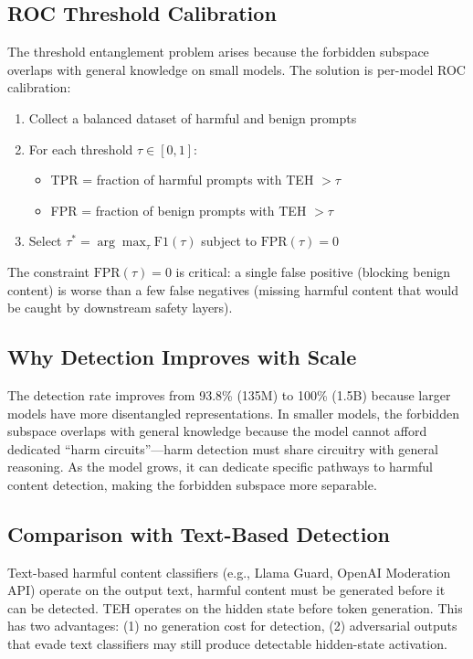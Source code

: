 \documentclass[11pt]{article}
\begin{document}
\subsection{ROC Threshold Calibration}

The threshold entanglement problem arises because the forbidden subspace overlaps with general knowledge on small models. The solution is per-model ROC calibration:

\begin{enumerate}[nosep]
\item Collect a balanced dataset of harmful and benign prompts
\item For each threshold $\tau \in [0, 1]$:
  \begin{itemize}[nosep]
  \item TPR = fraction of harmful prompts with TEH $> \tau$
  \item FPR = fraction of benign prompts with TEH $> \tau$
  \end{itemize}
\item Select $\tau^* = \arg\max_\tau \mathrm{F1}(\tau)$ subject to $\mathrm{FPR}(\tau) = 0$
\end{enumerate}

The constraint $\mathrm{FPR}(\tau) = 0$ is critical: a single false positive (blocking benign content) is worse than a few false negatives (missing harmful content that would be caught by downstream safety layers).

\subsection{Why Detection Improves with Scale}

The detection rate improves from 93.8\% (135M) to 100\% (1.5B) because larger models have more disentangled representations. In smaller models, the forbidden subspace overlaps with general knowledge because the model cannot afford dedicated ``harm circuits''---harm detection must share circuitry with general reasoning. As the model grows, it can dedicate specific pathways to harmful content detection, making the forbidden subspace more separable.

\subsection{Comparison with Text-Based Detection}

Text-based harmful content classifiers (e.g., Llama Guard, OpenAI Moderation API) operate on the output text, harmful content must be generated before it can be detected. TEH operates on the hidden state before token generation. This has two advantages: (1) no generation cost for detection, (2) adversarial outputs that evade text classifiers may still produce detectable hidden-state activation.
\end{document}
